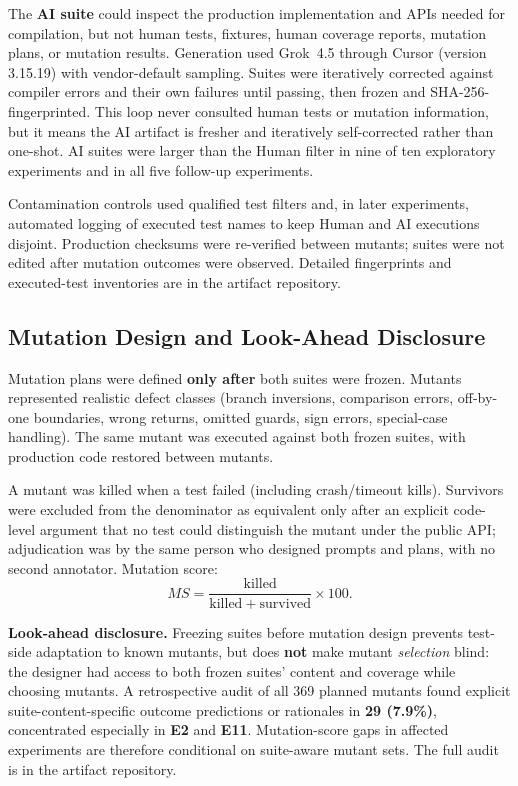 \documentclass[10pt,conference]{IEEEtran}
\begin{document}
The \textbf{AI suite} could inspect the production implementation and APIs needed for compilation, but not human tests, fixtures, human coverage reports, mutation plans, or mutation results. Generation used Grok~4.5 through Cursor (version 3.15.19) with vendor-default sampling. Suites were iteratively corrected against compiler errors and their own failures until passing, then frozen and SHA-256-fingerprinted. This loop never consulted human tests or mutation information, but it means the AI artifact is fresher and iteratively self-corrected rather than one-shot. AI suites were larger than the Human filter in nine of ten exploratory experiments and in all five follow-up experiments.

Contamination controls used qualified test filters and, in later experiments, automated logging of executed test names to keep Human and AI executions disjoint. Production checksums were re-verified between mutants; suites were not edited after mutation outcomes were observed. Detailed fingerprints and executed-test inventories are in the artifact repository.

\subsection{Mutation Design and Look-Ahead Disclosure}
Mutation plans were defined \textbf{only after} both suites were frozen. Mutants represented realistic defect classes (branch inversions, comparison errors, off-by-one boundaries, wrong returns, omitted guards, sign errors, special-case handling). The same mutant was executed against both frozen suites, with production code restored between mutants.

A mutant was killed when a test failed (including crash/timeout kills). Survivors were excluded from the denominator as equivalent only after an explicit code-level argument that no test could distinguish the mutant under the public API; adjudication was by the same person who designed prompts and plans, with no second annotator. Mutation score:
\begin{equation}
MS = \frac{\mathrm{killed}}{\mathrm{killed}+\mathrm{survived}}\times 100.
\end{equation}

\textbf{Look-ahead disclosure.} Freezing suites before mutation design prevents test-side adaptation to known mutants, but does \textbf{not} make mutant \emph{selection} blind: the designer had access to both frozen suites' content and coverage while choosing mutants. A retrospective audit of all 369 planned mutants found explicit suite-content-specific outcome predictions or rationales in \textbf{29 (7.9\%)}, concentrated especially in \textbf{E2} and \textbf{E11}. Mutation-score gaps in affected experiments are therefore conditional on suite-aware mutant sets. The full audit is in the artifact repository.
\end{document}
